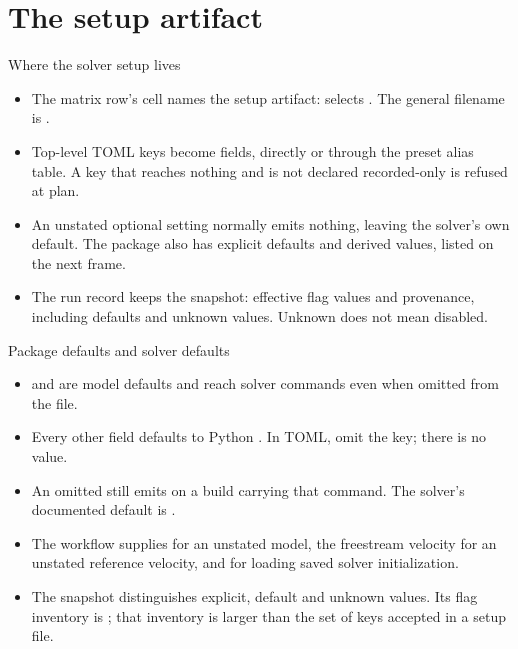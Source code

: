 %
\section{The setup artifact}

\begin{frame}{Where the solver setup lives}
\begin{itemize}\small
  \item The matrix row's  cell names the setup artifact:
         selects .
        The general filename is .
  \item Top-level TOML keys become  fields, directly
        or through the preset alias table. A key that reaches nothing and
        is not declared recorded-only is refused at plan.
  \item An unstated optional setting normally emits nothing, leaving the
        solver's own default. The package also has explicit defaults and
        derived values, listed on the next frame.
  \item The run record keeps the  snapshot: effective
        flag values and provenance, including defaults and unknown values.
        Unknown does not mean disabled.
\end{itemize}
\end{frame}

\begin{frame}{Package defaults and solver defaults}
\begin{itemize}\small
  \item {} and  are model
        defaults and reach solver commands even when omitted from the file.
  \item Every other  field defaults to Python
        . In TOML, omit the key; there is no  value.
  \item An omitted  still emits
         on a build carrying that command.
        The solver's documented default is .
  \item The workflow supplies  for an unstated model,
        the freestream velocity for an unstated reference velocity, and
         for loading saved solver initialization.
  \item The snapshot distinguishes explicit, default and unknown values.
        Its flag inventory is ; that inventory is larger
        than the set of keys accepted in a setup file.
\end{itemize}
\end{frame}

